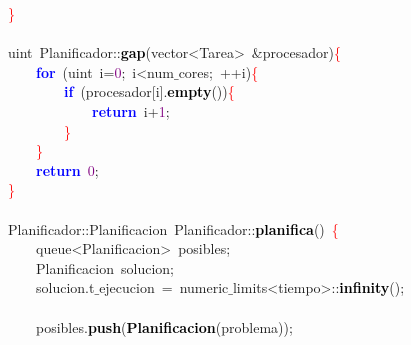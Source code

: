 \mbox{}\textcolor{Red}{\}} \\
\mbox{} \\
\mbox{}\textcolor{TealBlue}{uint}\ Planificador\textcolor{BrickRed}{::}\textbf{\textcolor{Black}{gap}}\textcolor{BrickRed}{(}\textcolor{TealBlue}{vector\textless{}Tarea\textgreater{}}\ \textcolor{BrickRed}{\&}procesador\textcolor{BrickRed}{)}\textcolor{Red}{\{} \\
\mbox{}\ \ \ \ \textbf{\textcolor{Blue}{for}}\ \textcolor{BrickRed}{(}\textcolor{TealBlue}{uint}\ i\textcolor{BrickRed}{=}\textcolor{Purple}{0}\textcolor{BrickRed}{;}\ i\textcolor{BrickRed}{\textless{}}num$\_$cores\textcolor{BrickRed}{;}\ \textcolor{BrickRed}{++}i\textcolor{BrickRed}{)}\textcolor{Red}{\{} \\
\mbox{}\ \ \ \ \ \ \ \ \textbf{\textcolor{Blue}{if}}\ \textcolor{BrickRed}{(}procesador\textcolor{BrickRed}{[}i\textcolor{BrickRed}{].}\textbf{\textcolor{Black}{empty}}\textcolor{BrickRed}{())}\textcolor{Red}{\{} \\
\mbox{}\ \ \ \ \ \ \ \ \ \ \ \ \textbf{\textcolor{Blue}{return}}\ i\textcolor{BrickRed}{+}\textcolor{Purple}{1}\textcolor{BrickRed}{;} \\
\mbox{}\ \ \ \ \ \ \ \ \textcolor{Red}{\}} \\
\mbox{}\ \ \ \ \textcolor{Red}{\}} \\
\mbox{}\ \ \ \ \textbf{\textcolor{Blue}{return}}\ \textcolor{Purple}{0}\textcolor{BrickRed}{;} \\
\mbox{}\textcolor{Red}{\}} \\
\mbox{} \\
\mbox{}Planificador\textcolor{BrickRed}{::}\textcolor{TealBlue}{Planificacion}\ Planificador\textcolor{BrickRed}{::}\textbf{\textcolor{Black}{planifica}}\textcolor{BrickRed}{()}\ \textcolor{Red}{\{} \\
\mbox{}\ \ \ \ \textcolor{TealBlue}{queue\textless{}Planificacion\textgreater{}}\ posibles\textcolor{BrickRed}{;} \\
\mbox{}\ \ \ \ \textcolor{TealBlue}{Planificacion}\ solucion\textcolor{BrickRed}{;} \\
\mbox{}\ \ \ \ solucion\textcolor{BrickRed}{.}t$\_$ejecucion\ \textcolor{BrickRed}{=}\ numeric$\_$limits\textcolor{BrickRed}{\textless{}}tiempo\textcolor{BrickRed}{\textgreater{}::}\textbf{\textcolor{Black}{infinity}}\textcolor{BrickRed}{();} \\
\mbox{} \\
\mbox{}\ \ \ \ posibles\textcolor{BrickRed}{.}\textbf{\textcolor{Black}{push}}\textcolor{BrickRed}{(}\textbf{\textcolor{Black}{Planificacion}}\textcolor{BrickRed}{(}problema\textcolor{BrickRed}{));} \\
